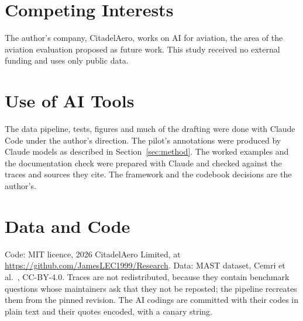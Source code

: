\documentclass[10pt,a4paper]{article}
\begin{document}
\section*{Competing Interests}

The author's company, CitadelAero, works on AI for aviation, the area of the
aviation evaluation proposed as future work. This study received no external
funding and uses only public data.

\section*{Use of AI Tools}

The data pipeline, tests, figures and much of the drafting were done with Claude
Code under the author's direction. The pilot's annotations were produced by Claude
models as described in Section~\ref{sec:method}. The worked examples and the
documentation check were prepared with Claude and checked against the traces and
sources they cite. The framework and the codebook decisions are the author's.

\section*{Data and Code}

Code: MIT licence, \textcopyright{} 2026 CitadelAero Limited, at
\url{https://github.com/JamesLEC1999/Research}. Data: MAST dataset, Cemri et
al.~\cite{cemri2025mast}, CC-BY-4.0. Traces are not redistributed, because they
contain benchmark questions whose maintainers ask that they not be reposted; the
pipeline recreates them from the pinned revision. The AI codings are committed
with their codes in plain text and their quotes encoded, with a canary string.
\end{document}
